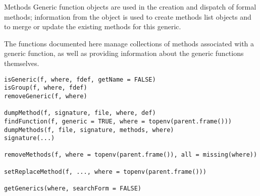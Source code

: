 %
\begin{Section}{Methods}
Generic function objects are used in the creation and dispatch of
formal methods; information from the object is used to create methods
list objects and to merge or update the existing methods for this
generic.
\end{Section}
%
\begin{Description}\relax
The functions documented here manage collections of methods associated
with a generic function, as well as providing information about the
generic functions themselves.
\end{Description}
%
\begin{Usage}
\begin{verbatim}
isGeneric(f, where, fdef, getName = FALSE)
isGroup(f, where, fdef)
removeGeneric(f, where)

dumpMethod(f, signature, file, where, def)
findFunction(f, generic = TRUE, where = topenv(parent.frame()))
dumpMethods(f, file, signature, methods, where)
signature(...)

removeMethods(f, where = topenv(parent.frame()), all = missing(where))

setReplaceMethod(f, ..., where = topenv(parent.frame()))

getGenerics(where, searchForm = FALSE)
\end{verbatim}
\end{Usage}
%
